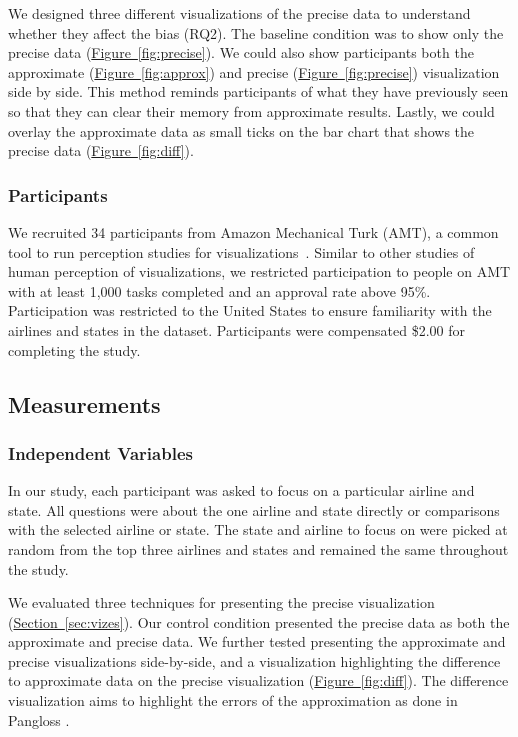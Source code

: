 \documentclass[10pt,journal,compsoc]{IEEEtran}
\newcommand{\figref}[1]{\hyperref[#1]{Figure~\ref*{#1}}}
\newcommand{\secref}[1]{\hyperref[#1]{Section~\ref*{#1}}}
\begin{document}
We designed three different visualizations of the precise data to understand whether they affect the bias (RQ2).
The baseline condition was to show only the precise data (\figref{fig:precise}).
We could also show participants both the approximate (\figref{fig:approx}) and precise (\figref{fig:precise}) visualization side by side.
This method reminds participants of what they have previously seen so that they can clear their memory from approximate results.
Lastly, we could overlay the approximate data as small ticks on the bar chart that shows the precise data (\figref{fig:diff}).

\subsubsection{Participants}

We recruited 34 participants from Amazon Mechanical Turk (AMT), a common tool to run perception studies for visualizations~\cite{heer2010crowdsourcing}.
Similar to other studies of human perception of visualizations, we restricted participation to people on AMT with at least 1,000 tasks completed and an approval rate above 95\%.
Participation was restricted to the United States to ensure familiarity with the airlines and states in the dataset.
Participants were compensated \$2.00 for completing the study.

\subsection{Measurements}
\subsubsection{Independent Variables}

In our study, each participant was asked to focus on a particular airline and state.
All questions were about the one airline and state directly or comparisons with the selected airline or state.
The state and airline to focus on were picked at random from the top three airlines and states and remained the same throughout the study.

We evaluated three techniques for presenting the precise visualization (\secref{sec:vizes}).
Our control condition presented the precise data as both the approximate and precise data.
We further tested presenting the approximate and precise visualizations side-by-side, and a visualization highlighting the difference to approximate data on the precise visualization (\figref{fig:diff}).
The difference visualization aims to highlight the errors of the approximation as done in Pangloss \cite{moritz2017pangloss}.
\end{document}
